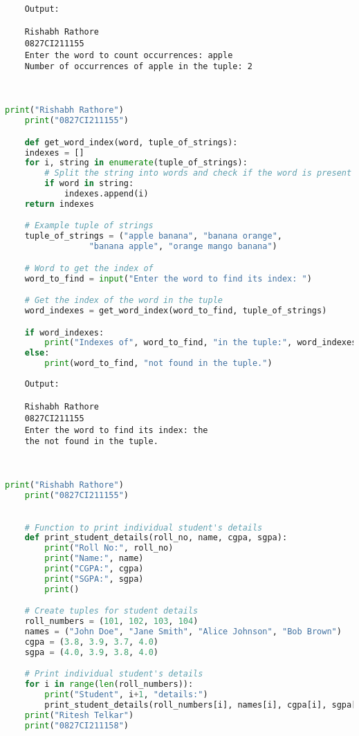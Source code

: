 \documentclass{report}
\begin{document}
\begin{verbatim}
	Output:

	Rishabh Rathore
	0827CI211155
	Enter the word to count occurrences: apple
	Number of occurrences of apple in the tuple: 2



\end{verbatim}


\newpage

\sol 
\begin{lstlisting}[language=Python]
	print("Rishabh Rathore")
	print("0827CI211155")

	def get_word_index(word, tuple_of_strings):
    indexes = []
    for i, string in enumerate(tuple_of_strings):
        # Split the string into words and check if the word is present
        if word in string:
            indexes.append(i)
    return indexes

	# Example tuple of strings
	tuple_of_strings = ("apple banana", "banana orange",
				 "banana apple", "orange mango banana")

	# Word to get the index of
	word_to_find = input("Enter the word to find its index: ")

	# Get the index of the word in the tuple
	word_indexes = get_word_index(word_to_find, tuple_of_strings)

	if word_indexes:
		print("Indexes of", word_to_find, "in the tuple:", word_indexes)
	else:
		print(word_to_find, "not found in the tuple.")

\end{lstlisting}

\begin{verbatim}
	Output:

	Rishabh Rathore
	0827CI211155
	Enter the word to find its index: the
	the not found in the tuple.



\end{verbatim}


\newpage

\sol 
\begin{lstlisting}[language=Python]
	print("Rishabh Rathore")
	print("0827CI211155")

	
	# Function to print individual student's details
	def print_student_details(roll_no, name, cgpa, sgpa):
		print("Roll No:", roll_no)
		print("Name:", name)
		print("CGPA:", cgpa)
		print("SGPA:", sgpa)
		print()

	# Create tuples for student details
	roll_numbers = (101, 102, 103, 104)
	names = ("John Doe", "Jane Smith", "Alice Johnson", "Bob Brown")
	cgpa = (3.8, 3.9, 3.7, 4.0)
	sgpa = (4.0, 3.9, 3.8, 4.0)

	# Print individual student's details
	for i in range(len(roll_numbers)):
		print("Student", i+1, "details:")
		print_student_details(roll_numbers[i], names[i], cgpa[i], sgpa[i])
	print("Ritesh Telkar")
	print("0827CI211158")
\end{lstlisting}
\end{document}
